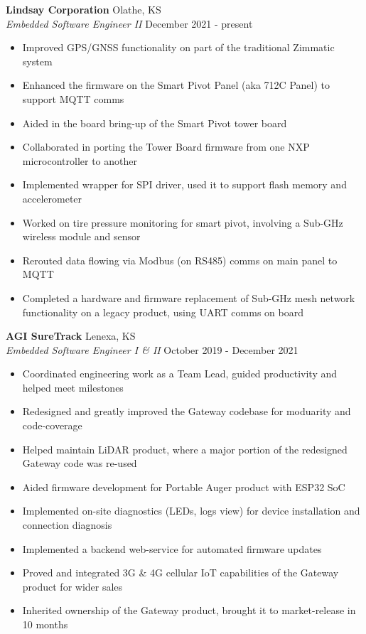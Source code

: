\documentclass[a4paper]{article}
\begin{document}
\textbf{Lindsay Corporation} \hfill Olathe, KS\\
\textit{Embedded Software Engineer II} \hfill December 2021 - present\\
\vspace{-1mm}
\begin{itemize} \itemsep 1pt
    \item Improved GPS/GNSS functionality on part of the traditional Zimmatic system
    \item Enhanced the firmware on the Smart Pivot Panel (aka 712C Panel) to support MQTT comms
    \item Aided in the board bring-up of the Smart Pivot tower board
    \item Collaborated in porting the Tower Board firmware from one NXP microcontroller to another
    \item Implemented wrapper for SPI driver, used it to support flash memory and accelerometer 
    \item Worked on tire pressure monitoring for smart pivot, involving a Sub-GHz wireless module and sensor
    \item Rerouted data flowing via Modbus (on RS485) comms on main panel to MQTT
    \item Completed a hardware and firmware replacement of Sub-GHz mesh network functionality on a legacy product, using UART comms on board
\end{itemize}
\textbf{AGI SureTrack} \hfill Lenexa, KS\\
\textit{Embedded Software Engineer I \& II} \hfill October 2019 - December 2021\\
\vspace{-1mm}
\begin{itemize} \itemsep 1pt
	\item Coordinated engineering work as a Team Lead, guided productivity and helped meet milestones
	\item Redesigned and greatly improved the Gateway codebase for moduarity and code-coverage
	\item Helped maintain LiDAR product, where a major portion of the redesigned Gateway code was re-used
	\item Aided firmware development for Portable Auger product with ESP32 SoC
	\item Implemented on-site diagnostics (LEDs, logs view) for device installation and connection diagnosis
	\item Implemented a backend web-service for automated firmware updates
	\item Proved and integrated 3G \& 4G cellular IoT capabilities of the Gateway product for wider sales
	\item Inherited ownership of the Gateway product, brought it to market-release in 10 months
\end{itemize}
\end{document}
